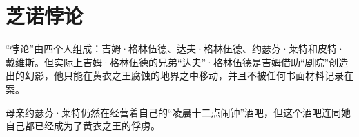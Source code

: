 \section{芝诺悖论}

“悖论”由四个人组成：吉姆·格林伍德、达夫·格林伍德、约瑟芬·莱特和皮特·戴维斯。但实际上吉姆·格林伍德的兄弟“达夫”·格林伍德是吉姆借助“剧院”创造出的幻影，他只能在黄衣之王腐蚀的地界之中移动，并且不被任何书面材料记录在案。

母亲约瑟芬·莱特仍然在经营着自己的“凌晨十二点闹钟”酒吧，但这个酒吧连同她自己都已经成为了黄衣之王的俘虏。